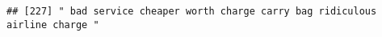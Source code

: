 \documentclass[
]{article}
\begin{document}
\begin{verbatim}
## [227] " bad service cheaper worth charge carry bag ridiculous airline charge "                                                                                                                                                                                                                                                                                                                                                                                                                                                                                                                                                                                                                                                                                                                                                                                                                                                                                                                                                                                                                                                                                                                                                                                                                                                                                                                                                                                                                                                                                                                                                                                                                                                                                                                        

\end{verbatim}
\end{document}
